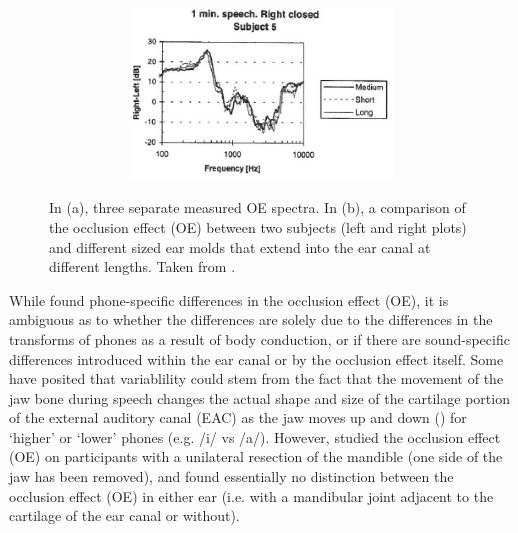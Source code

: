 \documentclass[dissertation,copyright]{uathesis}
\begin{document}
\begin{figure}
\begin{subfigure}{0.5\textwidth}
\begin{subfigure}{1\textwidth}
    \includegraphics[width=1\textwidth]{figure/Hansen_OE-plot_b.png}
  \end{subfigure}
  \caption{ }
  \label{hansenAverageOEb}
\end{subfigure}
\caption{In (a), three separate measured OE spectra. In (b), a comparison of the occlusion effect (OE) between two subjects (left and right plots) and different sized ear molds that extend into the ear canal at different lengths. Taken from \cite{hansen:97b}.}
\label{hansenAverageOE}
\end{figure}

While \cite{hansen:97b} found phone-specific differences in the occlusion effect (OE), it is ambiguous as to whether the differences are solely due to the differences in the transforms of phones as a result of body conduction, or if there are sound-specific differences introduced within the ear canal or by the occlusion effect itself.  Some have posited that variablility could stem from the fact that the movement of the jaw bone during speech changes the actual shape and size of the cartilage portion of the external auditory canal (EAC) as the jaw moves up and down (\cite{bekesy:60}) for `higher' or `lower' phones (e.g. /i/ vs /a/).  However, \cite{allen:60} studied the occlusion effect (OE) on participants with a unilateral resection of the mandible (one side of the jaw has been removed), and found essentially no distinction between the occlusion effect (OE) in either ear (i.e. with a mandibular joint adjacent to the cartilage of the ear canal or without).
\end{document}
